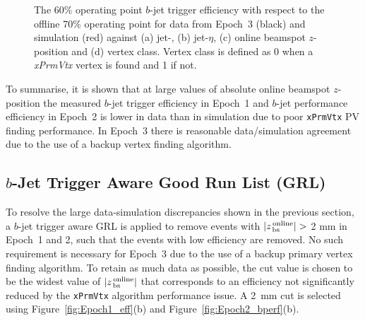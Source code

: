 \begin{figure}[!htb]
\begin{center}
\end{center}
\vspace{-1em}
\caption[  The $b$-jet trigger efficiency for data from Epoch~3 and simulation.]
        {
          The 60\% operating point $b$-jet trigger efficiency with respect to the offline 70\% operating point
          for data from Epoch~3 (black) and simulation (red) against (a) jet-\pT, (b) jet-$\eta$,
          (c) online beamspot $z$-position and (d) vertex class.
          Vertex class is defined as 0 when a \textit{xPrmVtx} vertex is found and 1 if not.}
\label{fig:Epoch3_eff}
\end{figure}

To summarise, it is shown that at large values of absolute online beamspot $z$-position
the measured $b$-jet trigger efficiency in Epoch~1 and $b$-jet performance efficiency in Epoch~2 is lower in data than in simulation
due to poor \verb|xPrmVtx| PV finding performance.
In Epoch~3 there is reasonable data/simulation agreement due to the use of a backup vertex finding algorithm. 

\newpage
\subsection{$b$-Jet Trigger Aware Good Run List (GRL)}
\label{sec:trig-grl}

To resolve the large data-simulation discrepancies shown in the previous section,
a $b$-jet trigger aware GRL is applied to remove events with $|z_{\,\text{bs}}^{\text{\,online}}| >$ 2 mm in Epoch~1 and 2,
such that the events with low efficiency are removed. No such requirement is necessary for Epoch~3 due to the use of a backup primary vertex finding algorithm.
To retain as much data as possible, the cut value is chosen to be the widest value of $|z_{\,\text{bs}}^{\text{\,online}}|$
that corresponds to an efficiency not significantly reduced by the \verb|xPrmVtx| algorithm performance issue.
A \SI{2}{\mm} cut is selected using Figure~\ref{fig:Epoch1_eff}(b) and Figure~\ref{fig:Epoch2_bperf}(b).

